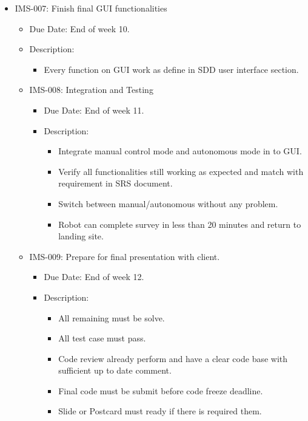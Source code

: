 \documentclass[11pt, a4paper]{article}
\begin{document}
\begin{itemize}
\begin{itemize}
\begin{itemize}
					\end{itemize}
				\end{itemize}
				\item IMS-007: Finish final GUI functionalities
				\begin{itemize}
				\item Due Date: End of week 10.
				\item Description:
				\begin{itemize}
					\item Every function on GUI work as define in SDD user interface section.
				\end{itemize}
				\item IMS-008: Integration and Testing
				\begin{itemize}
					\item Due Date: End of week 11.
					\item Description:
					\begin{itemize}
						\item Integrate manual control mode and autonomous mode in to GUI.
						\item Verify all functionalities still working as expected and match with requirement in SRS document.
						\item Switch between manual/autonomous without any problem.
						\item Robot can complete survey in less than 20 minutes and return to landing site.
					\end{itemize}
				\end{itemize}
				\item IMS-009: Prepare for final presentation with client.
				\begin{itemize}
					\item Due Date: End of week 12.
					\item Description:
					\begin{itemize}
						\item All remaining must be solve.
						\item All test case must pass.
						\item Code review already perform and have a clear code base with sufficient up to date comment.
						\item Final code must be submit before code freeze deadline.
						\item Slide or Postcard must ready if there is required them.
					\end{itemize}
				\end{itemize}
			\end{itemize}
		\end{itemize}
\end{document}
